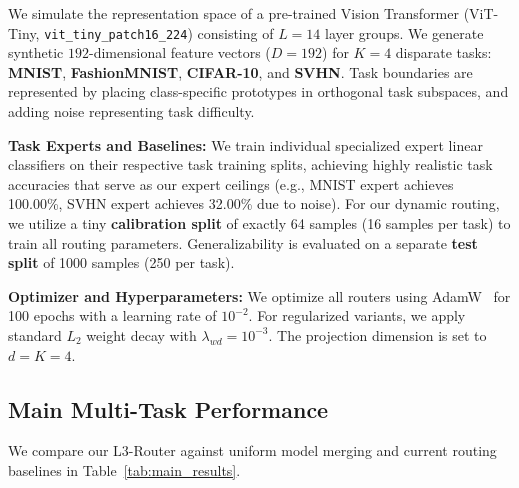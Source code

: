 We simulate the representation space of a pre-trained Vision Transformer (ViT-Tiny, \texttt{vit\_tiny\_patch16\_224}) consisting of $L=14$ layer groups. We generate synthetic $192$-dimensional feature vectors ($D=192$) for $K=4$ disparate tasks: \textbf{MNIST}, \textbf{FashionMNIST}, \textbf{CIFAR-10}, and \textbf{SVHN}. Task boundaries are represented by placing class-specific prototypes in orthogonal task subspaces, and adding noise representing task difficulty.

\textbf{Task Experts and Baselines:} We train individual specialized expert linear classifiers on their respective task training splits, achieving highly realistic task accuracies that serve as our expert ceilings (e.g., MNIST expert achieves 100.00\%, SVHN expert achieves 32.00\% due to noise). For our dynamic routing, we utilize a tiny \textbf{calibration split} of exactly 64 samples (16 samples per task) to train all routing parameters. Generalizability is evaluated on a separate \textbf{test split} of 1000 samples (250 per task).

\textbf{Optimizer and Hyperparameters:} We optimize all routers using AdamW~\cite{loshchilov2017decoupled} for 100 epochs with a learning rate of $10^{-2}$. For regularized variants, we apply standard $L_2$ weight decay with $\lambda_{wd} = 10^{-3}$. The projection dimension is set to $d = K = 4$.


\subsection{Main Multi-Task Performance}
\label{subsec:main_results}
We compare our L3-Router against uniform model merging and current routing baselines in Table~\ref{tab:main_results}.

